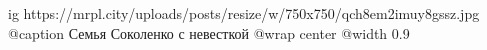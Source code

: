 
 
 
 
 

\ifcmt
  ig https://mrpl.city/uploads/posts/resize/w/750x750/qch8em2imuy8gssz.jpg
	@caption Семья Соколенко с невесткой
  @wrap center
  @width 0.9
\fi

